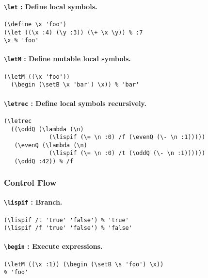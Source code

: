 \documentclass[10pt,a4paper]{article}
\newcommand{\pT}[1]{\textbf{\texttt{\textbackslash #1}}}
\begin{document}
\paragraph{\pT{let} : Define local symbols.}
\begin{verbatim}
(\define \x 'foo')
(\let ((\x :4) (\y :3)) (\+ \x \y)) % :7
\x % 'foo'
\end{verbatim}



\paragraph{\pT{letM} : Define mutable local symbols.}

\begin{verbatim}
(\letM ((\x 'foo'))
  (\begin (\setB \x 'bar') \x)) % 'bar'
\end{verbatim}



\paragraph{\pT{letrec} : Define local symbols recursively.}

\begin{verbatim}
(\letrec
  ((\oddQ (\lambda (\n)
             (\lispif (\= \n :0) /f (\evenQ (\- \n :1)))))
   (\evenQ (\lambda (\n)
             (\lispif (\= \n :0) /t (\oddQ (\- \n :1))))))
   (\oddQ :42)) % /f
\end{verbatim}


\subsubsection{Control Flow}

\paragraph{\pT{lispif} : Branch.}
\begin{verbatim}
(\lispif /t 'true' 'false') % 'true'
(\lispif /f 'true' 'false') % 'false'
\end{verbatim}

\paragraph{\pT{begin} : Execute expressions.}
\begin{verbatim}
(\letM ((\x :1)) (\begin (\setB \s 'foo') \x))
% 'foo'
\end{verbatim}
\end{document}
